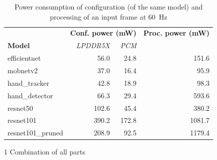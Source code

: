 \begin{table}[hbtp]
    \centering
    \begin{threeparttable}
        \begin{tabular}{@{}lrrr@{}}
            \toprule
                                       & \multicolumn{2}{l}{\textbf{Conf. power (mW)}} & \textbf{Proc. power (mW)} \\ \cmidrule(l){2-3} 
            \textbf{Model}             & \textit{LPDDR5X}  & \textit{PCM}    & \\ \midrule
            efficientnet               & 56.0              & 24.8            & 151.6 \\
            mobnetv2                   & 37.0              & 16.4            & 95.9 \\
            hand\_tracker              & 42.8              & 18.9            & 98.3 \\
            hand\_detector             & 66.3              & 29.4            & 593.6 \\
            resnet50                   & 102.6             & 45.4            & 380.2 \\
            resnet101\tnote{1}         & 390.2             & 172.8           & 1081.7 \\
            resnet101\_pruned\tnote{1} & 208.9             & 92.5            & 1179.4 \\ \bottomrule
        \end{tabular}
        \begin{tablenotes}
            \item[1] Combination of all parts
        \end{tablenotes}
    \end{threeparttable}
    \caption{Power consumption of configuration (of the same model) and processing of an input frame at \SI{60}{Hz}}
    \label{tab:example_models_power_consumption}
\end{table}
    